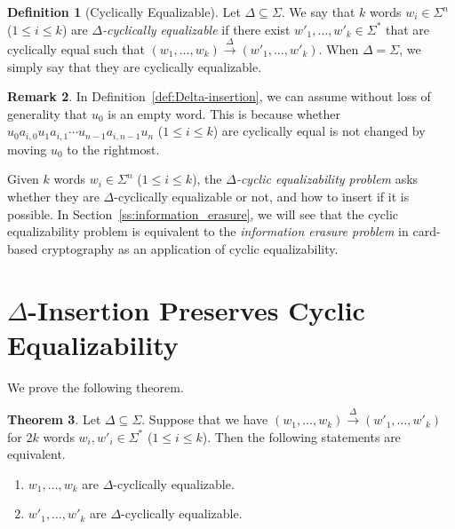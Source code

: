 \documentclass{article}
\theoremstyle{definition}
\newtheorem{theorem}{Theorem}[section]
\newtheorem{definition}[theorem]{Definition}
\newtheorem{remark}[theorem]{Remark}
\newcommand{\insto}[1]{\overset{{#1}}{\to}}
\begin{document}
\begin{definition}[Cyclically Equalizable]
    \label{def:cyclically-equalizable}
    Let $\Delta \subseteq \Sigma$.
    We say that $k$ words $w_i \in \Sigma^n$ ($1 \leq i \leq k$) are \emph{$\Delta$-cyclically equalizable} if there exist $w'_1,\dots,w'_k \in \Sigma^*$ that are cyclically equal such that $(w_1,\dots,w_k)\insto{\Delta} (w'_1,\dots,w'_k)$. 
    When $\Delta = \Sigma$, we simply say that they are cyclically equalizable. 
\end{definition}

\begin{remark}
    \label{rem:initial_subword_is_not_needed}
    In Definition~\ref{def:Delta-insertion}, we can assume without loss of generality that $u_0$ is an empty word. 
    This is because whether $u_0 a_{i,0} u_1 a_{i,1} \cdots u_{n-1} a_{i,n-1} u_n$ ($1 \leq i \leq k$) are cyclically equal is not changed by moving $u_0$ to the rightmost. 
\end{remark}

Given $k$ words $w_i \in \Sigma^n$ ($1 \leq i \leq k$), the \emph{$\Delta$-cyclic equalizability problem} asks whether they are $\Delta$-cyclically equalizable or not, and how to insert if it is possible. 
In Section~\ref{ss:information_erasure}, we will see that the cyclic equalizability problem is equivalent to the \emph{information erasure problem} in card-based cryptography as an application of cyclic equalizability. 

\section{$\Delta$-Insertion Preserves Cyclic Equalizability}

We prove the following theorem.

\begin{theorem}
    \label{thm:equalizability_is_invariant_under_insertion}
    Let $\Delta \subseteq \Sigma$. 
    Suppose that we have $(w_1,\dots,w_k) \insto{\Delta} (w'_1,\dots,w'_k)$ for $2k$ words $w_i, w'_i \in \Sigma^*$ ($1 \leq i  \leq k$). 
    Then the following statements are equivalent.
    \begin{enumerate}
        \item $w_1,\dots,w_k$ are $\Delta$-cyclically equalizable.
        \item $w'_1,\dots,w'_k$ are $\Delta$-cyclically equalizable.
    \end{enumerate}
\end{theorem}
\end{document}
